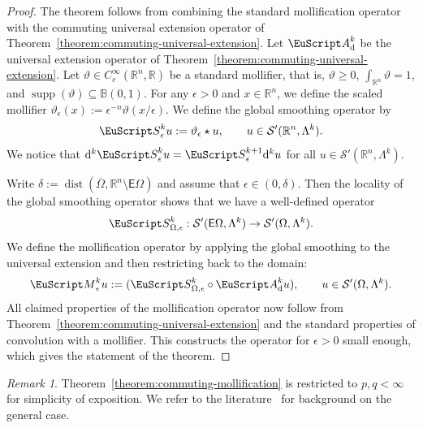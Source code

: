\documentclass[10pt,a4paper]{amsart}
\theoremstyle{definition}
\theoremstyle{remark}
\newtheorem{remark}[theorem]{Remark}
\numberwithin{equation}{section}
\newcommand{\bbB}{{\mathbb B}}
\newcommand{\bbR}{{\mathbb R}}
\newcommand{\calS}{{\mathcal S}}
\newcommand{\euA}{{\EuScript A}}
\newcommand{\euM}{{\EuScript M}}
\newcommand{\euS}{{\EuScript S}}
\newcommand{\sfE}{{\mathsf E}}
\newcommand{\closure}{\overline}
\newcommand{\Ball}[2]{\bbB(#1,#2)}
\newcommand{\supp}{\operatorname{supp}}
\newcommand{\cartan}{{\mathrm d}}
\newcommand{\Domain}{{\Omega}}
\newcommand{\extDomain}{{\sfE\Omega}}
\newcommand{\Alt}[1]{\Lambda^{#1}}
\newcommand{\kommErweiterung}{\euA_{\cartan}}
\newcommand{\Mollifier}{{\euM}}
\newcommand{\weight}{\vartheta}
\begin{document}
\begin{proof}
    The theorem follows from combining the standard mollification operator with the commuting universal extension operator of Theorem~\ref{theorem:commuting-universal-extension}.
    Let $\kommErweiterung^{k}$ be the universal extension operator of Theorem~\ref{theorem:commuting-universal-extension}.
    Let $\weight \in C^{\infty}_{c}(\bbR^{n},\bbR)$ be a standard mollifier, that is, $\weight \geq 0$, $\int_{\bbR^{n}} \weight = 1$, and $\supp(\weight) \subseteq \Ball{0}{1}$.
    For any $\epsilon > 0$ and $x \in \bbR^{n}$, we define the scaled mollifier $\weight_{\epsilon}(x) := \epsilon^{-n} \weight(x/\epsilon)$.
    We define the global smoothing operator by 
    \begin{align*}
        \euS^{k}_{\epsilon} u := \weight_{\epsilon} \star u,
        \qquad 
        u \in \calS'(\bbR^{n},\Alt{k})
        .
    \end{align*}
    We notice that $\cartan^{k} \euS^{k}_{\epsilon} u = \euS^{k+1}_{\epsilon} \cartan^{k} u$ for all $u \in \calS'(\bbR^{n},\Alt{k})$.
    
    Write $\delta := \operatorname{dist}( \closure\Domain, \bbR^{n} \setminus \extDomain)$ and assume that $\epsilon \in (0,\delta)$. 
    Then the locality of the global smoothing operator shows that we have a well-defined operator
    \begin{align*}
        \euS^{k}_{\Domain,\epsilon} : \calS'(\extDomain,\Alt{k}) \to \calS'(\Domain,\Alt{k})
        .
    \end{align*}
    We define the mollification operator by applying the global smoothing to the universal extension and then restricting back to the domain:
    \begin{align*}
        \Mollifier^{k}_{\epsilon} u := ( \euS^{k}_{\Domain,\epsilon} \circ \kommErweiterung^{k} u ) ,
        \qquad 
        u \in \calS'(\Domain,\Alt{k})
        .
    \end{align*}
    All claimed properties of the mollification operator now follow from Theorem~\ref{theorem:commuting-universal-extension} and the standard properties of convolution with a mollifier.
    This constructs the operator for $\epsilon > 0$ small enough, which gives the statement of the theorem.
\end{proof}

\begin{remark}
    Theorem~\ref{theorem:commuting-mollification} is restricted to $p, q < \infty$ for simplicity of exposition. 
    We refer to the literature~\cite[Section~2.1.3]{runstsickel} for background on the general case.
\end{remark}
\end{document}
